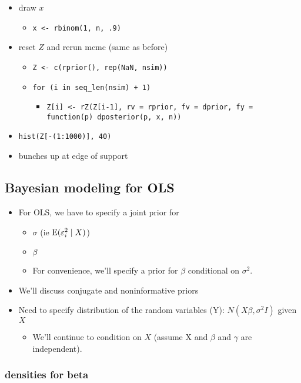 \begin{itemize}
\begin{itemize}
\item draw $x$
\begin{itemize}
\item \texttt{x <- rbinom(1, n, .9)}
\end{itemize}
\item reset $Z$ and rerun mcmc (same as before)
\begin{itemize}
\item \texttt{Z <- c(rprior(), rep(NaN, nsim))}
\item \texttt{for (i in seq\_len(nsim) + 1)}
\begin{itemize}
\item \texttt{Z[i] <- rZ(Z[i-1], rv = rprior, fv = dprior, fy = function(p) dposterior(p, x, n))}
\end{itemize}
\end{itemize}
\item \texttt{hist(Z[-(1:1000)], 40)}
\item bunches up at edge of support
\end{itemize}
\end{itemize}

\subsection{Bayesian modeling for OLS}

\begin{itemize}[leftmargin=0pt]
\item For OLS, we have to specify a joint prior for
\begin{itemize}
\item $\sigma$ (ie $\operatorname{E}(\varepsilon^2_i \mid X)$)
\item $\beta$
\item For convenience, we'll specify a prior for $\beta$ conditional on $\sigma^2$.
\end{itemize}
\item We'll discuss conjugate and noninformative priors
\item Need to specify distribution of the random variables (Y): $N(X\beta,
  \sigma^2 I)$ given $X$
\begin{itemize}
\item We'll continue to condition on $X$ (assume X and $\beta$ and $\gamma$ are
  independent).
\end{itemize}
\end{itemize}

\subsubsection{densities for beta}

